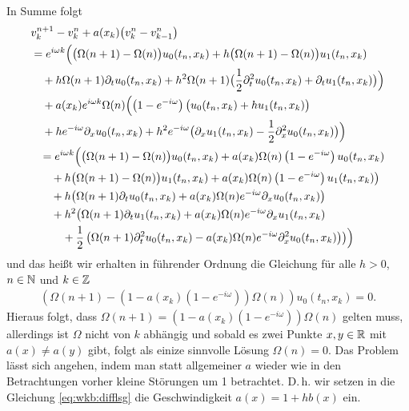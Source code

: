 In Summe folgt
\begin{align}
\begin{split}
&v^{n+1}_k - v^n_k + a(x_k) \bigl( v^n_k - v^n_{k-1} \bigr)\\
&= e^{i \omega k} \Bigl( \bigl(\Omega(n+1) - \Omega(n) \bigr) u_0(t_n, x_k) + h \bigl(\Omega(n+1) - \Omega(n) \bigr) u_1(t_n, x_k)\\
&\quad + h \Omega(n+1) \partial_t u_0(t_n, x_k) + h^2 \Omega(n+1) \bigl( \frac{1}{2} \partial^2_t u_0(t_n, x_k) + \partial_t u_1(t_n, x_k) \bigr) \Bigr)\\
&\quad + a(x_k) e^{i \omega k} \Omega(n) \Bigl( \left(1-e^{-i \omega}\right) \bigl( u_0(t_n, x_k) + h u_1(t_n, x_k) \bigr)\\
&\quad + h e^{-i \omega} \partial_x u_0(t_n, x_k) + h^2 e^{-i \omega} \bigl( \partial_x u_1(t_n, x_k) - \frac{1}{2} \partial^2_x u_0(t_n, x_k) \bigr) \Bigr)\\
\end{split}\\
\label{eq:wkb:difflsg}
\begin{split}
&= e^{i \omega k} \Bigl(
\bigl(\Omega(n+1) - \Omega(n) \bigr) u_0(t_n, x_k) + a(x_k) \Omega(n) \left(1-e^{-i \omega}\right) u_0(t_n, x_k)\\
&\quad + h \bigl(\Omega(n+1) - \Omega(n) \bigr) u_1(t_n, x_k) + a(x_k) \Omega(n) \left(1-e^{-i \omega}\right) u_1(t_n, x_k) \bigr)\\
&\quad + h \bigl( \Omega(n+1) \partial_t u_0(t_n, x_k) + a(x_k) \Omega(n) e^{-i \omega} \partial_x u_0(t_n, x_k) \bigr)\\
&\quad + h^2 \bigl( \Omega(n+1) \partial_t u_1(t_n, x_k) + a(x_k) \Omega(n) e^{-i \omega} \partial_x u_1(t_n, x_k)\\
&\qquad + \frac{1}{2} \left( \Omega(n+1) \partial^2_t u_0(t_n, x_k) - a(x_k) \Omega(n) e^{-i \omega} \partial^2_x u_0(t_n, x_k) \right) \bigr) 
\Bigr)
\end{split}
\end{align}
und das heißt wir erhalten in führender Ordnung die Gleichung für alle $h > 0$, $n \in \mathbb N$ und $k \in \mathbb Z$
\begin{align}
\left( \Omega(n+1) - \left( 1 - a(x_k) \left(1-e^{-i \omega}\right) \right) \Omega(n) \right) u_0(t_n, x_k) = 0.
\end{align}
Hieraus folgt, dass 
$\Omega(n+1) = \left( 1 - a(x_k) \left(1-e^{-i \omega}\right) \right) \Omega(n)$
gelten muss, allerdings ist $\Omega$ nicht von $k$ abhängig und sobald es zwei Punkte $x,y \in \mathbb R$ mit $a(x) \neq a(y)$ gibt, folgt als einize sinnvolle Lösung $\Omega(n) = 0$.
Das Problem lässt sich angehen, indem man statt allgemeiner $a$ wieder wie in den Betrachtungen vorher kleine Störungen um 1 betrachtet.
D.\,h. wir setzen in die Gleichung \eqref{eq:wkb:difflsg} die Geschwindigkeit $a(x) = 1 + h b(x)$ ein.

